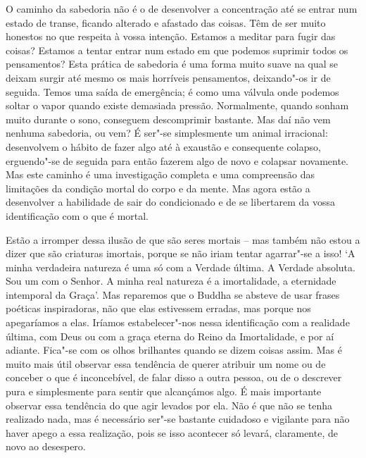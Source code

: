 O caminho da sabedoria não é o de desenvolver a concentração até se
entrar num estado de transe, ficando alterado e afastado das coisas. Têm
de ser muito honestos no que respeita à vossa intenção. Estamos a
meditar para fugir das coisas? Estamos a tentar entrar num estado em que
podemos suprimir todos os pensamentos? Esta prática de sabedoria é uma
forma muito suave na qual se deixam surgir até mesmo os mais horríveis
pensamentos, deixando"-os ir de seguida. Temos uma saída de emergência; é
como uma válvula onde podemos soltar o vapor quando existe demasiada
pressão. Normalmente, quando sonham muito durante o sono, conseguem
descomprimir bastante. Mas daí não vem nenhuma sabedoria, ou vem? É
ser"-se simplesmente um animal irracional: desenvolvem o hábito de fazer
algo até à exaustão e consequente colapso, erguendo"-se de seguida para
então fazerem algo de novo e colapsar novamente. Mas este caminho é uma
investigação completa e uma compreensão das limitações da condição
mortal do corpo e da mente. Mas agora estão a desenvolver a habilidade
de sair do condicionado e de se libertarem da vossa identificação com o
que é mortal.

Estão a irromper dessa ilusão de que são seres mortais -- mas também não
estou a dizer que são criaturas imortais, porque se não iriam tentar
agarrar"-se a isso! `A minha verdadeira natureza
é uma só com a Verdade última. A Verdade absoluta. Sou um com
o Senhor. A minha real natureza é a imortalidade, a eternidade
intemporal da Graça'. Mas reparemos que o Buddha se absteve de usar
frases poéticas inspiradoras, não que elas estivessem erradas, mas
porque nos apegaríamos a elas. Iríamos estabelecer"-nos nessa
identificação com a realidade última, com Deus ou com a graça eterna do
Reino da Imortalidade, e por aí adiante. Fica"-se com os olhos brilhantes
quando se dizem coisas assim. Mas é muito mais útil observar essa
tendência de querer atribuir um nome ou de conceber o que é
inconcebível, de falar disso a outra pessoa, ou de o descrever pura e
simplesmente para sentir que alcançámos algo. É mais importante observar
essa tendência do que agir levados por ela. Não é que não se tenha
realizado nada, mas é necessário ser"-se bastante cuidadoso e vigilante
para não haver apego a essa realização, pois se isso acontecer só
levará, claramente, de novo ao desespero.

